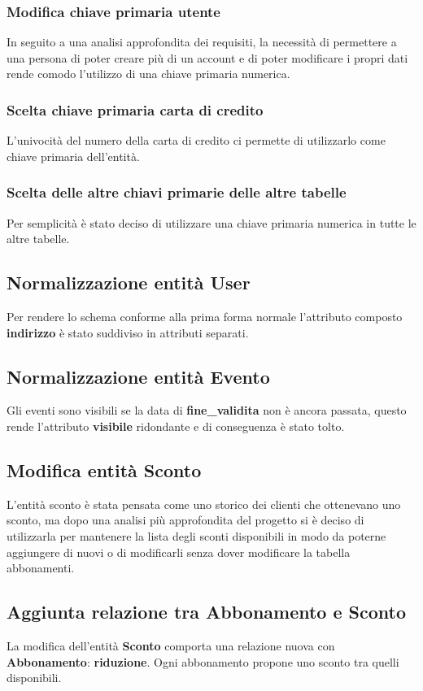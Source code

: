 \subsubsection{Modifica chiave primaria utente}
In seguito a una analisi approfondita dei requisiti, la necessità di permettere a una persona di poter creare più di un account e di poter modificare i propri dati rende comodo l'utilizzo di una chiave primaria numerica.  

\subsubsection{Scelta chiave primaria carta di credito}
L'univocità del numero della carta di credito ci permette di utilizzarlo come chiave primaria dell'entità.

\subsubsection{Scelta delle altre chiavi primarie delle altre tabelle}
Per semplicità è stato deciso di utilizzare una chiave primaria numerica in tutte le altre tabelle.

\subsection{Normalizzazione entità User} 
Per rendere lo schema conforme alla prima forma normale l'attributo composto \textbf{indirizzo} è stato suddiviso in attributi separati.

\subsection{Normalizzazione entità Evento}
Gli eventi sono visibili se la data di
\textbf{fine{\_}validita} non è ancora passata,
questo rende l'attributo 
\textbf{visibile} ridondante 
e di conseguenza è stato tolto.

\subsection{Modifica entità Sconto}
L'entità sconto è stata pensata come uno storico dei clienti che ottenevano uno sconto, ma dopo una analisi più approfondita del progetto si è deciso di utilizzarla per mantenere la lista degli sconti disponibili in modo da poterne aggiungere di nuovi o di modificarli senza dover modificare la tabella abbonamenti.  

\subsection{Aggiunta relazione tra Abbonamento e Sconto}
La modifica dell'entità \textbf{Sconto} comporta una relazione nuova con \textbf{Abbonamento}: \textbf{riduzione}. Ogni abbonamento propone uno sconto tra quelli disponibili.

